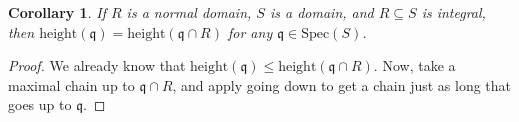 \documentclass{amsart}[12pt]
\def\htt{\mathrm{height}}
\newcommand{\p}{{\mathfrak p}}
\newcommand{\q}{{\mathfrak q}}
\numberwithin{equation}{section}
\theoremstyle{plain} %
\newtheorem{corollary}[equation]{Corollary}
\theoremstyle{definition}
\newtheorem{exer}[equation]{Optional Exercise}
\theoremstyle{remark}
\newtheorem{remark}[equation]{Remark}
\newcommand{\Spec}{\mathrm{Spec}}
\begin{document}
%
%


\begin{corollary}
If $R$ is a normal domain, $S$ is a domain, and $R\subseteq S$ is integral, then $\mathrm{height}(\q)=\mathrm{height}(\q \cap R)$ for any $\q\in \Spec(S)$.
\end{corollary}
\begin{proof}
We already know that $\htt(\q) \leq \htt(\q \cap R)$. Now, take a maximal chain up to $\q\cap R$, and apply going down to get a chain just as long that goes up to $\q$.
\end{proof}


\


\end{document}
